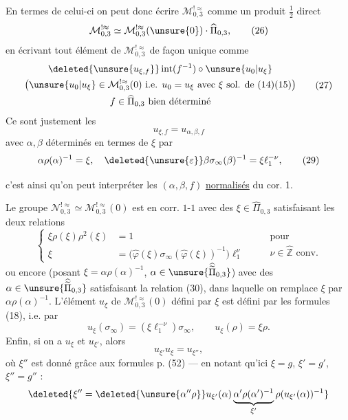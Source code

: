 En termes de celui-ci on peut donc écrire $\mathcal M_{0,3}^{!\approx}$ comme un produit $\frac12$ direct
\[
\mathcal M_{0,3}^{!\approx}\simeq\mathcal M_{0,3}^{!\approx}(\unsure{0})\cdot\widehat\Pi_{0,3},
\tag{26}
\]
en écrivant tout élément de $\mathcal M_{0,3}^{!\approx}$ de façon unique comme
\[
\begin{gathered}
\deleted{\unsure{u_{\xi,f}}}\operatorname{int}(f^{-1})\circ\unsure{u_0|u_\xi}\\
\bigl(\unsure{u_0|u_\xi}\in\mathcal M_{0,3}^{!\approx}(0)\text{ i.e. }u_0=u_\xi\text{ avec }\xi\text{ sol. de }(14)(15)\bigr)\\
f\in\widehat\Pi_{0,3}\text{ bien déterminé}
\end{gathered}
\tag{27}
\]
Ce sont justement les  
\[
u_{\xi,f}=u_{\alpha,\beta,f}
\tag{28}
\]
avec $\alpha,\beta$ déterminés en termes de $\xi$ par
\[
\alpha\rho(\alpha)^{-1}=\xi,\quad\deleted{\unsure{\varepsilon}}\beta\sigma_\infty(\beta)^{-1}=\xi \ell_1^{-\nu},
\tag{29}
\]


c'est ainsi qu'on peut interpréter les  $(\alpha,\beta,f)$ \uline{normalisés} du cor. 1.

\uline{}  Le groupe $\mathcal N_{0,3}^{!\approx}\simeq\mathcal M_{0,3}^{!\approx}(0)$ est en corr. $1$-$1$ avec  des $\xi\in\widehat\Pi_{0,3}$ satisfaisant les deux relations
\[
\left\{
\begin{aligned}
\xi\rho(\xi)\rho^2(\xi)&=1\\
\xi&=\bigl(\widehat\varphi(\xi)\sigma_\infty(\widehat\varphi(\xi))^{-1}\bigr)\ell_1^\nu
\end{aligned}
\right.
\qquad\begin{gathered}\text{pour}\\\nu\in\widehat{\mathbb Z}\text{ conv.}\end{gathered}
\tag{30}
\]
ou encore (posant $\xi=\alpha\rho(\alpha)^{-1}$, $\alpha\in\unsure{\widehat{\widetilde\Pi}_{0,3}}$) avec  des $\alpha\in\unsure{\widehat{\widetilde\Pi}_{0,3}}$ satisfaisant la  relation (30), dans laquelle on remplace $\xi$ par $\alpha\rho(\alpha)^{-1}$. L'élément $u_\xi$ de $\mathcal M_{0,3}^{!\approx}(0)$ défini par $\xi$ est défini par les formules (18), i.e. par
\[
u_\xi(\sigma_\infty)=(\xi \ell_1^{-\nu})\sigma_\infty,
\qquad u_\xi(\rho)=\xi\rho.
\tag{31}
\]
Enfin, si on a $u_\xi$ et $u_{\xi'}$, alors
\[
u_{\xi'}u_\xi=u_{\xi''},
\tag{32}
\]
où $\xi''$ est donné grâce aux formules p.  (52) --- en notant qu'ici $\xi=g$, $\xi'=g'$, $\xi''=g''$ :
\[
\deleted{\xi''=\deleted{\unsure{\alpha''\rho}}u_{\xi'}(\alpha)\underbrace{\alpha'\rho(\alpha')^{-1}}_{\xi'}\rho(u_{\xi'}(\alpha))^{-1}}
\]

